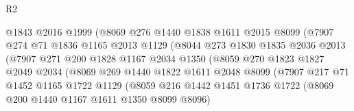 \begin{lexlean}{R2}
\begin{coremodule}
                                @1843
                                @2016
                                @1999
                                (@8069
                                  @276
                                  @1440
                                  @1838
                                  @1611
                                  @2015
                                  @8099
                                  (@7907
                                    @274
                                    @71
                                    @1836
                                    @1165
                                    @2013
                                    @1129
                                    (@8044
                                      @273
                                      @1830
                                      @1835
                                      @2036
                                      @2013
                                      (@7907
                                        @271
                                        @200
                                        @1828
                                        @1167
                                        @2034
                                        @1350
                                        (@8059
                                          @270
                                          @1823
                                          @1827
                                          @2049
                                          @2034
                                          (@8069
                                            @269
                                            @1440
                                            @1822
                                            @1611
                                            @2048
                                            @8099
                                            (@7907
                                              @217
                                              @71
                                              @1452
                                              @1165
                                              @1722
                                              @1129
                                              (@8059
                                                @216
                                                @1442
                                                @1451
                                                @1736
                                                @1722
                                                (@8069 @200 @1440 @1167 @1611 @1350 @8099 @8096)

\end{coremodule}
\end{lexlean}
